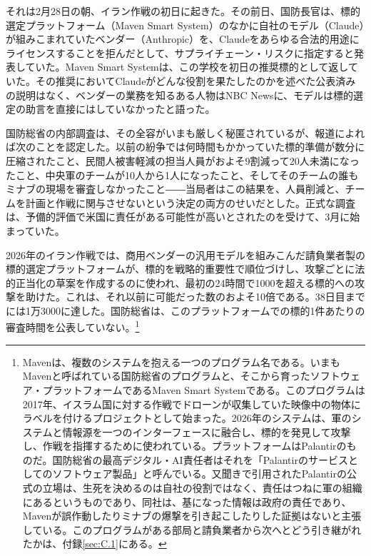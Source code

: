それは2月28日の朝、イラン作戦の初日に起きた\autocite{Amnesty2026Minab,crs2026iranwar}。その前日、国防長官は、標的選定プラットフォーム（Maven Smart System）のなかに自社のモデル（Claude）が組みこまれていたベンダー（Anthropic）を、Claudeをあらゆる合法的用途にライセンスすることを拒んだとして、サプライチェーン・リスクに指定すると発表していた\autocite{npr2026openai}。Maven Smart Systemは、この学校を初日の推奨標的として返していた\autocite{livingstone2026maven,gizmodo2026minab}。その推奨においてClaudeがどんな役割を果たしたのかを述べた公表済みの説明はなく、ベンダーの業務を知るある人物はNBC Newsに、モデルは標的選定の助言を直接にはしていなかったと語った\autocite{nbc2026targeting}。

国防総省の内部調査は、その全容がいまも厳しく秘匿されているが、報道によれば次のことを認定した。以前の紛争では何時間もかかっていた標的準備が数分に圧縮されたこと、民間人被害軽減の担当人員がおよそ9割減って20人未満になったこと、中央軍のチームが10人から1人になったこと、そしてそのチームの誰もミナブの現場を審査しなかったこと――当局者はこの結果を、人員削減と、チームを計画と作戦に関与させないという決定の両方のせいだとした\autocite{Bloomberg2026KillChain}。正式な調査は、予備的評価で米国に責任がある可能性が高いとされたのを受けて、3月に始まっていた\autocite{NPR2026MinabProbe}。

2026年のイラン作戦では、商用ベンダーの汎用モデルを組みこんだ請負業者製の標的選定プラットフォームが、標的を戦略的重要性で順位づけし、攻撃ごとに法的正当化の草案を作成するのに使われ\autocite{livingstone2026maven}、最初の24時間で1000を超える標的への攻撃を助けた。これは、それ以前に可能だった数のおよそ10倍である\autocite{csis2026maven}。38日目までには1万3000に達した\autocite{breakingdefense2026maven}。国防総省は、このプラットフォームでの標的1件あたりの審査時間を公表していない。\footnote{Mavenは、複数のシステムを抱える一つのプログラム名である。いまもMavenと呼ばれている国防総省のプログラムと、そこから育ったソフトウェア・プラットフォームであるMaven Smart Systemである\autocite{csis2026maven}。このプログラムは2017年、イスラム国に対する作戦でドローンが収集していた映像中の物体にラベルを付けるプロジェクトとして始まった\autocite{weisgerber2017maven,fang2019maven}。2026年のシステムは、軍のシステムと情報源を一つのインターフェースに融合し、標的を発見して攻撃し、作戦を指揮するために使われている\autocite{defensescoop2026transition}。プラットフォームはPalantirのものだ。国防総省の最高デジタル・AI責任者はそれを「Palantirのサービスとしてのソフトウェア製品」と呼んでいる\autocite{defensescoop2026transition}。又聞きで引用されたPalantirの公式の立場は、生死を決めるのは自社の役割ではなく、責任はつねに軍の組織にあるというものであり\autocite{lee2026palantir}、同社は、基になった情報は政府の責任であり、Mavenが誤作動したりミナブの爆撃を引き起こしたりした証拠はないと主張している\autocite{Bloomberg2026KillChain}。このプログラムがある部局と請負業者から次へとどう引き継がれたかは、付録\ref{sec:C.1}にある。}

